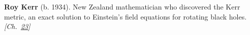 \textbf{Roy Kerr} (b. 1934). New Zealand mathematician who discovered the Kerr metric, an exact solution to Einstein's field equations for rotating black holes. \emph{[Ch.~\hyperref[ch:blackholetimedilationredshift]{23}]}

